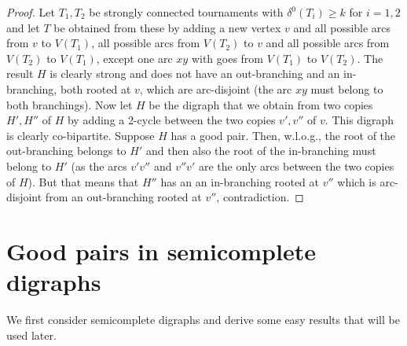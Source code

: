 \documentclass{article}
\theoremstyle{definition}
\newcommand{\2}{\vspace{0.2cm}}
\begin{document}
\begin{proof}
  Let $T_1,T_2$ be strongly connected tournaments with
  $\delta^0{}(T_i)\geq k$ for $i=1,2$ and let $T$ be obtained from
  these by adding a new vertex $v$ and all possible arcs from $v$ to
  $V(T_1)$, all possible arcs from $V(T_2)$ to $v$ and all possible
  arcs from $V(T_2)$ to $V(T_1)$, except one arc $xy$ with goes from
  $V(T_1)$ to $V(T_2)$. The result $H$ is clearly strong and does not
  have an out-branching and an in-branching, both rooted at $v$, which
  are arc-disjoint (the arc $xy$ must belong to both branchings). Now
  let $H$ be the digraph that we obtain from two copies $H',H''$ of
  $H$ by adding a 2-cycle between the two copies $v',v''$ of $v$. This
  digraph is clearly co-bipartite. Suppose $H$ has a good pair. Then,
  w.l.o.g., the root of the out-branching belongs to $H'$ and then also
  the root of the in-branching must belong to $H'$ (as the arcs
  $v'v''$ and $v''v'$ are the only arcs between the two copies of
  $H$). But that means that $H''$ has an an in-branching rooted at
  $v''$ which is arc-disjoint from an out-branching rooted at $v''$,
  contradiction.
  \end{proof}


\section{Good pairs in semicomplete digraphs}

We first consider semicomplete digraphs and derive some easy results
that will be used later.
\end{document}
